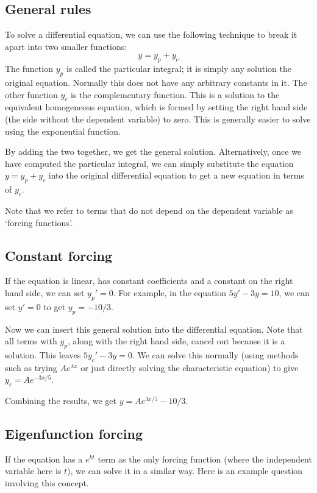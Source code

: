 \subsection{General rules}
To solve a differential equation, we can use the following technique to break it apart into two smaller functions:
\[
	y = y_p + y_c
\]
The function \(y_p\) is called the particular integral; it is simply any solution
the original equation.
Normally this does not have any arbitrary constants in it.
The other function \(y_c\) is the complementary function.
This is a solution to the equivalent homogeneous equation, which is formed by setting the right hand side (the side without the dependent variable) to zero.
This is generally easier to solve using the exponential function.

By adding the two together, we get the general solution.
Alternatively, once we have computed the particular integral, we can simply substitute the equation \(y = y_p + y_c\) into the original differential equation to get a new equation in terms of \(y_c\).

Note that we refer to terms that do not depend on the dependent variable as `forcing functions'.

\subsection{Constant forcing}
If the equation is linear, has constant coefficients and a constant on the right hand side, we can set \(y_p' = 0\).
For example, in the equation \(5y' - 3y = 10\), we can set \(y' = 0\) to get \(y_p = -10/3\).

Now we can insert this general solution into the differential equation.
Note that all terms with \(y_p\), along with the right hand side, cancel out because it is a solution.
This leaves \(5y_c' - 3y = 0\).
We can solve this normally (using methods such as trying \(Ae^{\lambda x}\) or just directly solving the characteristic equation) to give \(y_c = Ae^{-3x/5}\).

Combining the results, we get \(y = Ae^{3x/5} - 10/3\).

\subsection{Eigenfunction forcing}
If the equation has a \(e^{kt}\) term as the only forcing function (where the independent variable here is \(t\)), we can solve it in a similar way.
Here is an example question involving this concept.

